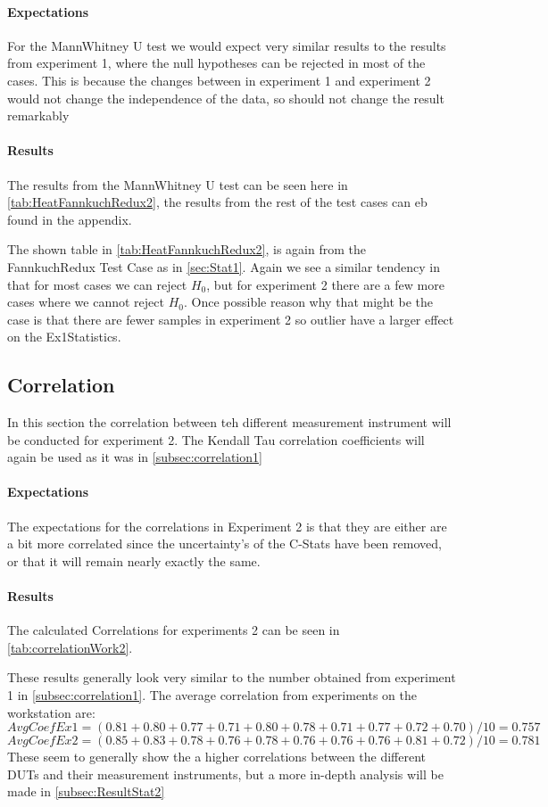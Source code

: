 \paragraph{Expectations}
For the MannWhitney U test we would expect very similar results to the results from experiment 1, where the null hypotheses can be rejected in most of the cases. This is because the changes between in experiment 1 and experiment 2 would not change the independence of the data, so should not change the result remarkably

\paragraph{Results}
The results from the MannWhitney U test can be seen here in \cref{tab:HeatFannkuchRedux2}, the results from the rest of the test cases can eb found in the appendix.

The shown table in \cref{tab:HeatFannkuchRedux2}, is again from the FannkuchRedux Test Case as in \cref{sec:Stat1}. Again we see a similar tendency in that for most cases we can reject $H_0$, but for experiment 2 there are a few more cases where we cannot reject $H_0$. Once possible reason why that might be the case is that there are fewer samples in experiment 2 so outlier have a larger effect on the Ex1Statistics.

\subsection{Correlation}\label{subsec:correlation2}
In this section the correlation between teh different measurement instrument will be conducted for experiment 2. The Kendall Tau correlation coefficients will again be used as it was in \cref{subsec:correlation1}

\paragraph{Expectations}
The expectations for the correlations in Experiment 2 is that they are either are a bit more correlated since the uncertainty's of the C-Stats have been removed, or that it will remain nearly exactly the same.
\paragraph{Results}
The calculated Correlations for experiments 2 can be seen in \cref{tab:correlationWork2}.

These results generally look very similar to the number obtained from experiment 1 in \cref{subsec:correlation1}. 
The average correlation from experiments on the workstation are:
$$AvgCoefEx1 = (0.81+0.80+0.77+0.71+0.80+0.78+0.71+0.77+0.72+0.70)/10 = 0.757$$
$$AvgCoefEx2 = (0.85+0.83+0.78+0.76+0.78+0.76+0.76+0.76+0.81+0.72)/10 = 0.781$$
These seem to generally show the a higher correlations between the different DUTs and their measurement instruments, but a more in-depth analysis will be made in \cref{subsec:ResultStat2}

